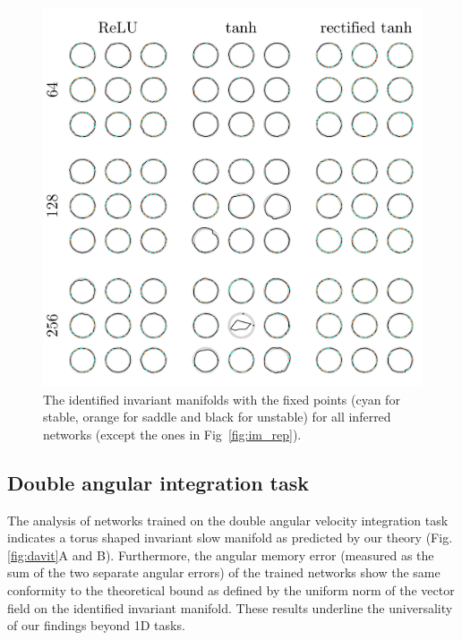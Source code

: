 \documentclass{article} %
\newcounter{ct}
\theoremstyle{definition}
\theoremstyle{remark}
\begin{document}
\newpage
\begin{figure}[tbhp]
     \centering
    \includegraphics[width=\textwidth]{im_all_3x3_s}
       \caption{The identified invariant manifolds with the fixed points (cyan for stable, orange for saddle and black for unstable) for all inferred networks (except the ones in Fig~\ref{fig:im_rep}).}\label{fig:im_all}
\end{figure}



\newpage
\subsection{Double angular integration task}\label{sec:supp:davit}

The analysis of networks trained on the double angular velocity integration task indicates a torus shaped invariant slow manifold as predicted by our theory (Fig.\ref{fig:davit}A and B).
Furthermore, the angular memory error (measured as the sum of the two separate angular errors) of the trained networks show the same conformity to the theoretical bound as defined by the uniform norm of the vector field on the identified invariant manifold.
These results underline the universality of our findings beyond 1D tasks.
\end{document}
